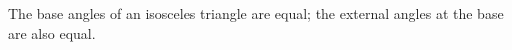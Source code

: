  The base angles of an isosceles triangle are equal; the external angles
at the base are also equal.
